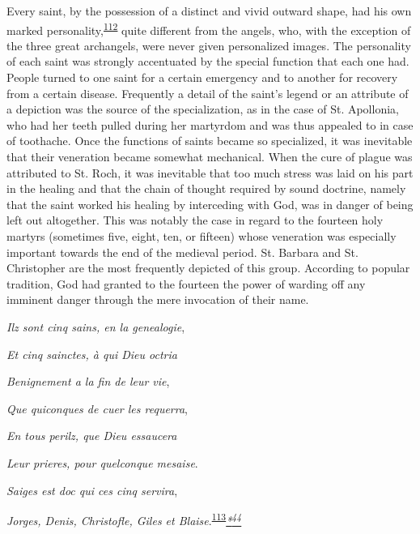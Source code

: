 Every saint, by the possession of a distinct and vivid outward
\protect\hypertarget{13_Chapter_Six__THE_DEPICTION_OF_TH.xhtmlux5cux23page_197}{}{}shape,
had his own marked
personality,\textsuperscript{\protect\hypertarget{13_Chapter_Six__THE_DEPICTION_OF_TH.xhtmlux5cux23id_1049}{\protect\hyperlink{23_NOTES.xhtmlux5cux23id_1050}{112}}}
quite different from the angels, who, with the exception of the three
great archangels, were never given personalized images. The personality
of each saint was strongly accentuated by the special function that each
one had. People turned to one saint for a certain emergency and to
another for recovery from a certain disease. Frequently a detail of the
saint's legend or an attribute of a depiction was the source of the
specialization, as in the case of St. Apollonia, who had her teeth
pulled during her martyrdom and was thus appealed to in case of
toothache. Once the functions of saints became so specialized, it was
inevitable that their veneration became somewhat mechanical. When the
cure of plague was attributed to St. Roch, it was inevitable that too
much stress was laid on his part in the healing and that the chain of
thought required by sound doctrine, namely that the saint worked his
healing by interceding with God, was in danger of being left out
altogether. This was notably the case in regard to the fourteen holy
martyrs (sometimes five, eight, ten, or fifteen) whose veneration was
especially important towards the end of the medieval period. St. Barbara
and St. Christopher are the most frequently depicted of this group.
According to popular tradition, God had granted to the fourteen the
power of warding off any imminent danger through the mere invocation of
their name.

\emph{Ilz sont cinq sains, en la genealogie},

\emph{Et cinq sainctes, à qui Dieu octria}

\emph{Benignement a la fin de leur vie},

\emph{Que quiconques de cuer les requerra},

\emph{En tous perilz, que Dieu essaucera}

\emph{Leur prieres, pour quelconque mesaise}.

\emph{Saiges est doc qui ces cinq servira},

\emph{Jorges, Denis, Christofle, Giles et
Blaise}.\textsuperscript{\protect\hypertarget{13_Chapter_Six__THE_DEPICTION_OF_TH.xhtmlux5cux23id_1047}{\protect\hyperlink{23_NOTES.xhtmlux5cux23id_1048}{113}}}\emph{\protect\hypertarget{13_Chapter_Six__THE_DEPICTION_OF_TH.xhtmlux5cux23id_3063}{\protect\hyperlink{23_NOTES.xhtmlux5cux23id_3064}{*\textsuperscript{44}}}}

